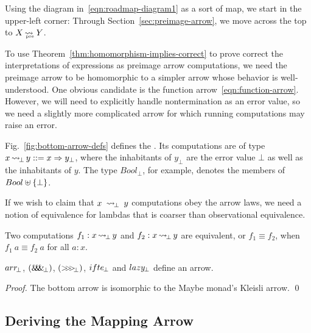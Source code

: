 \documentclass{llncs}
\newcommand{\figref}[1]{Fig.~\ref{#1}}
\newcommand{\arrow}{\rightsquigarrow}
\newcommand{\arrowarr}{\ensuremath{arr}}
\newcommand{\arrowcomp}{\ensuremath{{>}\mspace{-6mu}{>}\mspace{-6mu}{>}}}
\newcommand{\arrowpair}{\ensuremath{\mathit{\&\mspace{-7.5mu}\&\mspace{-7.5mu}\&}}}
\newcommand{\arrowif}{\ensuremath{ifte}}
\newcommand{\arrowlazy}{\ensuremath{lazy}}
\DeclareMathOperator{\botto}{\arrow_{\mspace{-3mu}\bot}}
\newcommand{\arrbot}{\arrowarr_{\mspace{-3mu}\bot}}
\newcommand{\compbot}{\arrowcomp_{\mspace{-5mu}\bot}}
\newcommand{\pairbot}{\arrowpair_{\mspace{-3mu}\bot}}
\newcommand{\ifbot}{\arrowif_{\mspace{-2mu}\bot}}
\newcommand{\lazybot}{\arrowlazy_{\mspace{-2mu}\bot}}
\newcommand{\pre}{_\mathrm{pre}}
\DeclareMathOperator{\preto}{\arrow_{\mspace{-19mu}\pre}}
\begin{document}
Using the diagram in~\eqref{eqn:roadmap-diagram1} as a sort of map, we start in the upper-left corner:
Through Section~\ref{sec:preimage-arrow}, we move across the top to $X \preto Y$.

To use Theorem~\ref{thm:homomorphism-implies-correct} to prove correct the interpretations of expressions as preimage arrow computations, we need the preimage arrow to be homomorphic to a simpler arrow whose behavior is well-understood.
One obvious candidate is the function arrow~\eqref{eqn:function-arrow}.
However, we will need to explicitly handle nontermination as an error value, so we need a slightly more complicated arrow for which running computations may raise an error.

\figref{fig:bottom-arrow-defs} defines the .
Its computations are of type $x \botto y ::= x \tto y_\bot$, where the inhabitants of $y_\bot$ are the error value $\bot$ as well as the inhabitants of $y$.
The type $Bool_\bot$, for example, denotes the members of $Bool \uplus \{{\bot}\}$.

If we wish to claim that $x~\botto~y$ computations obey the arrow laws, we need a notion of equivalence for lambdas that is coarser than observational equivalence.
\begin{definition}
Two computations $f_1 : x \botto y$ and $f_2 : x \botto y$ are equivalent, or $f_1 \equiv f_2$, when $f_1~a \equiv f_2~a$ for all $a : x$.
\end{definition}

\begin{theorem}
$\arrbot$, $(\pairbot)$, $(\compbot)$, $\ifbot$ and $\lazybot$ define an arrow.
\end{theorem}
\begin{proof}
The bottom arrow is isomorphic to the Maybe monad's Kleisli arrow.
\qed
\end{proof}

\subsection{Deriving the Mapping Arrow}
\end{document}
